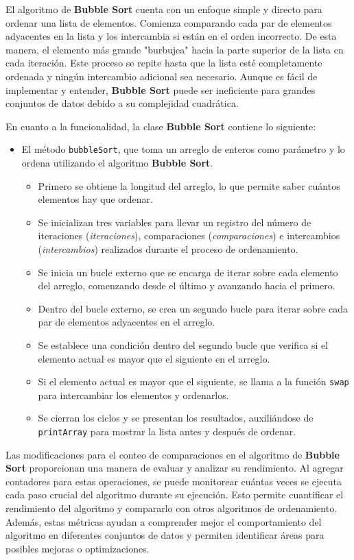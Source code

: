 \documentclass[12pt]{article}
\begin{document}
El algoritmo de \textbf{Bubble Sort} cuenta con un enfoque simple y directo para ordenar una lista de elementos. Comienza comparando cada par de elementos adyacentes en la lista y los intercambia si están en el orden incorrecto. De esta manera, el elemento más grande "burbujea" hacia la parte superior de la lista en cada iteración. Este proceso se repite hasta que la lista esté completamente ordenada y ningún intercambio adicional sea necesario. Aunque es fácil de implementar y entender, \textbf{Bubble Sort} puede ser ineficiente para grandes conjuntos de datos debido a su complejidad cuadrática.
\par\vspace{0.4cm}
En cuanto a la funcionalidad, la clase \textbf{Bubble Sort} contiene lo siguiente:
\begin{itemize}
  \item El método \texttt{bubbleSort}, que toma un arreglo de enteros como parámetro y lo ordena utilizando el algoritmo \textbf{Bubble Sort}.
  \begin{itemize}
    \item Primero se obtiene la longitud del arreglo, lo que permite saber cuántos elementos hay que ordenar.
    \item Se inicializan tres variables para llevar un registro del número de iteraciones (\textit{iteraciones}), comparaciones (\textit{comparaciones}) e intercambios (\textit{intercambios}) realizados durante el proceso de ordenamiento.
    \item Se inicia un bucle externo que se encarga de iterar sobre cada elemento del arreglo, comenzando desde el último y avanzando hacia el primero.
    \item Dentro del bucle externo, se crea un segundo bucle para iterar sobre cada par de elementos adyacentes en el arreglo.
    \item Se establece una condición dentro del segundo bucle que verifica si el elemento actual es mayor que el siguiente en el arreglo.
    \item Si el elemento actual es mayor que el siguiente, se llama a la función \texttt{swap} para intercambiar los elementos y ordenarlos.
    \item Se cierran los ciclos y se presentan los resultados, auxiliándose de \texttt{printArray} para mostrar la lista antes y después de ordenar.
  \end{itemize}
\end{itemize}
Las modificaciones para el conteo de comparaciones en el algoritmo de \textbf{Bubble Sort} proporcionan una manera de evaluar y analizar su rendimiento. Al agregar contadores para estas operaciones, se puede monitorear cuántas veces se ejecuta cada paso crucial del algoritmo durante su ejecución. Esto permite cuantificar el rendimiento del algoritmo y compararlo con otros algoritmos de ordenamiento. Además, estas métricas ayudan a comprender mejor el comportamiento del algoritmo en diferentes conjuntos de datos y permiten identificar áreas para posibles mejoras o optimizaciones.
\end{document}
